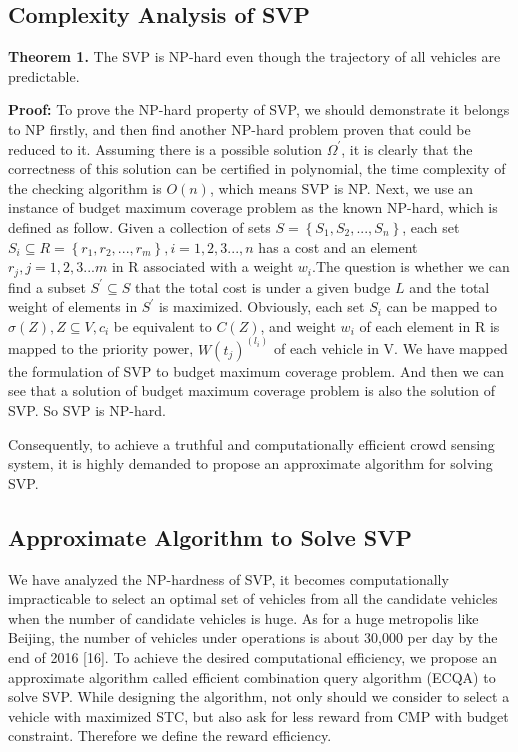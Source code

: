 \documentclass[journal]{IEEEtran}
\begin{document}
\subsection{Complexity Analysis of SVP}
\noindent
\textbf{Theorem 1.} The SVP is NP-hard even though the trajectory of all vehicles are predictable.

\noindent
\textbf{Proof:} To prove the NP-hard property of SVP, we should demonstrate it belongs to NP firstly, and then find another NP-hard problem proven that could be reduced to it. Assuming there is a possible solution $\Omega^{'}$, it is clearly that the correctness of this solution can be certified in polynomial, the time complexity of the checking algorithm is $O(n)$, which means SVP is NP. Next, we use an instance of budget maximum coverage problem as the known NP-hard, which is defined as follow. Given a collection of sets $S=\left \{S_{1},S_{2},...,S_{n}\right \}$, each set $S_{i}\subseteq R=\left \{ r_{1},r_{2},...,r_{m} \right \},i=1,2,3...,n$ has a cost  and an element $r_{j},j=1,2,3...m$ in R associated with a weight $w_{i}$.The question is whether we can find a subset  $S^{'}\subseteq S$ that the total cost is under a given budge $L$ and the total weight of elements in $S^{'}$ is maximized. Obviously, each set $S_{i}$ can be mapped to $\sigma(Z),Z\subseteq V,c_{i}$ be equivalent to $C(Z)$, and weight $w_{i}$ of each element in R is mapped to the priority power, $W(t_{j})^(l_{i})$ of each vehicle in V. We have mapped the formulation of SVP to budget maximum coverage problem. And then we can see that a solution of budget maximum coverage problem is also the solution of SVP. So SVP is NP-hard.

Consequently, to achieve a truthful and computationally efficient crowd sensing system, it is highly demanded to propose an approximate algorithm for solving SVP.
\subsection{Approximate Algorithm to Solve SVP}
We have analyzed the NP-hardness of SVP, it becomes computationally impracticable to select an optimal set of vehicles from all the candidate vehicles when the number of candidate vehicles is huge. As for a huge metropolis like Beijing, the number of vehicles under operations is about 30,000 per day by the end of 2016 [16]. To achieve the desired computational efficiency, we propose an approximate algorithm called efficient combination query algorithm (ECQA) to solve SVP. While designing the algorithm, not only should we consider to select a vehicle with maximized STC, but also ask for less reward from CMP with budget constraint. Therefore we define the reward efficiency.
\end{document}
